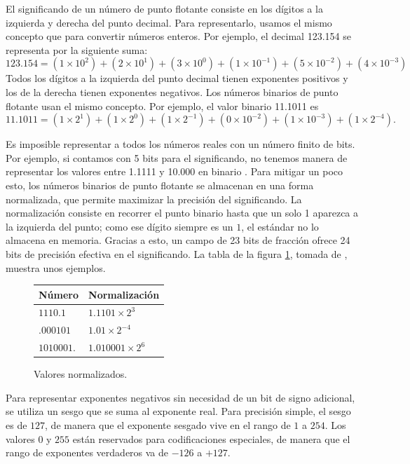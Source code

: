 \documentclass[12pt]{article}
\begin{document}
El significando de un número de punto flotante consiste en los dígitos a la
izquierda y derecha del punto decimal. Para representarlo, usamos el mismo
concepto que para convertir números enteros. Por ejemplo, el decimal 123.154 se
representa por la siguiente suma:
\begin{equation*}
  123.154 = (1 \times 10^{2}) + (2 \times 10^{1}) + (3 \times 10^{0}) +
  (1 \times 10^{-1}) + (5 \times 10^{-2}) + (4 \times 10^{-3})
\end{equation*}
Todos los dígitos a la izquierda del punto decimal tienen exponentes positivos
y los de la derecha tienen exponentes negativos. Los números binarios de punto flotante usan el mismo concepto. Por ejemplo, el valor binario 11.1011 es
\begin{equation*}
  11.1011 = (1 \times 2^{1}) + (1 \times 2^{0}) + (1 \times 2^{-1}) +
  (0 \times 10^{-2}) + (1 \times 10^{-3}) + (1 \times 2^{-4}).
\end{equation*}

Es imposible representar a todos los números reales con un número finito de
bits. Por ejemplo, si contamos con 5 bits para el significando, no tenemos
manera de representar los valores entre 1.1111 y 10.000 en binario
\parencite{IrvineBook}. Para mitigar un poco esto, los números binarios de
punto flotante se almacenan en una forma normalizada, que permite maximizar la
precisión del significando. La normalización consiste en recorrer el punto
binario hasta que un solo 1 aparezca a la izquierda del punto; como ese dígito
siempre es un $1$, el estándar no lo almacena en memoria. Gracias a esto, un
campo de 23 bits de fracción ofrece 24 bits de precisión efectiva en el
significando. La tabla de la figura \ref{tabla-normalizados}, tomada de
\textcite{IrvineBook}, muestra unos ejemplos.

\begin{figure}[ht]
\centering
  \begin{tabular}{l l}
    Número & Normalización \\
    \hline \hline
    $1110.1$ & $1.1101 \times 2^{3}$ \\ \hline
    $.000101$ & $1.01 \times 2^{-4}$ \\ \hline
    $1010001.$ & $1.010001 \times 2^{6}$ \\
  \end{tabular}
\caption{Valores normalizados.}
\label{tabla-normalizados}
\end{figure}

Para representar exponentes negativos sin necesidad de un bit de signo
adicional, se utiliza un sesgo que se suma al exponente real. Para precisión
simple, el sesgo es de $127$, de manera que el exponente sesgado vive en el
rango de $1$ a $254$. Los valores $0$ y $255$ están reservados para
codificaciones especiales, de manera que el rango de exponentes verdaderos va
de $-126$ a $+127$.
\end{document}
